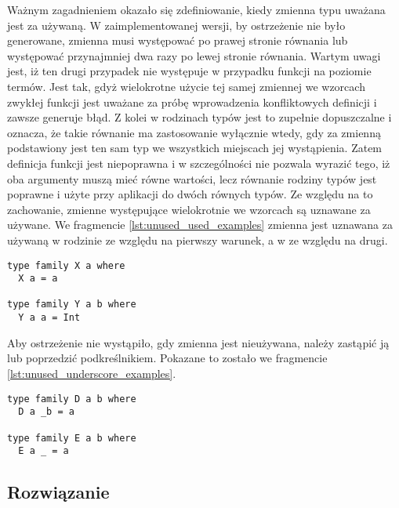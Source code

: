 Ważnym zagadnieniem okazało się zdefiniowanie, kiedy zmienna typu uważana jest
za używaną. W zaimplementowanej wersji, by ostrzeżenie nie było generowane,
zmienna musi występować po prawej stronie równania lub występować przynajmniej
dwa razy po lewej stronie równania. Wartym uwagi jest, iż ten drugi przypadek
nie występuje w przypadku funkcji na poziomie termów. Jest tak, gdyż wielokrotne
użycie tej samej zmiennej we wzorcach zwykłej funkcji jest uważane za
próbę wprowadzenia konfliktowych definicji i zawsze generuje błąd.
Z kolei w rodzinach typów jest to zupełnie dopuszczalne i oznacza, że takie
równanie ma zastosowanie wyłącznie wtedy, gdy za zmienną podstawiony jest ten sam
typ we wszystkich miejscach jej wystąpienia. Zatem definicja funkcji 
jest niepoprawna i w szczególności nie pozwala wyrazić tego, iż oba argumenty muszą mieć
równe wartości, lecz równanie rodziny typów  jest poprawne
i użyte przy aplikacji  do dwóch równych typów. Ze względu na to
zachowanie, zmienne występujące wielokrotnie we wzorcach są uznawane za używane.
We fragmencie \ref{lst:unused_used_examples} zmienna  jest uznawana za
używaną w rodzinie  ze względu na pierwszy warunek, a w 
ze względu na drugi.

\begin{lstlisting}[float,label={lst:unused_used_examples},
                   caption={Przykład funkcji na poziomie typów ze zmiennymi uznawanymi za wykorzystywane.}]
type family X a where
  X a = a

type family Y a b where
  Y a a = Int
\end{lstlisting}

Aby ostrzeżenie nie wystąpiło, gdy zmienna jest nieużywana, należy zastąpić ją
lub poprzedzić podkreślnikiem. Pokazane to zostało we fragmencie
\ref{lst:unused_underscore_examples}.

\begin{lstlisting}[float,label={lst:unused_underscore_examples},
                   caption={Przykład funkcji na poziomie typów ze zmiennymi zastąpionymi lub poprzedzonymi podkreślnikami.}]
type family D a b where
  D a _b = a

type family E a b where
  E a _ = a
\end{lstlisting}

\subsection{Rozwiązanie} %

